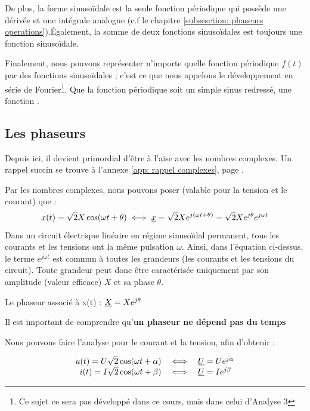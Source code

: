 \documentclass[12pt,a4paper]{article}
\newcommand{\ux}{\uline{X} }
\newcommand{\uu}{\uline{U} }
\begin{document}
De plus, la forme sinusoïdale est la seule fonction périodique qui possède une dérivée et une intégrale analogue (c.f le chapitre \ref{subsesction: phaseurs operations}).Également, la somme de deux fonctions sinusoïdales est toujours une fonction sinusoïdale.

 Finalement, nous pouvons représenter n'importe quelle fonction périodique $f(t)$ par des fonctions sinusoïdales ; c'est ce que nous appelons le développement en série de Fourier\footnote{Ce sujet ce sera pas développé dans ce cours, mais dans celui d'Analyse 3}. Que la fonction périodique soit un simple sinus redressé, une fonction .

\subsection{Les phaseurs}
 Depuis ici, il devient primordial d'être à l'aise avec les nombres complexes. Un rappel succin se trouve à l'annexe \ref{app: rappel complexes}, page \pageref{app: rappel complexes}. 

 Par les nombres complexes, nous pouvons poser (valable pour la tension et le courant) que :
\begin{equation}
	x(t) = \sqrt{2}X \cos(\omega t + \theta) \iff \uline{x} = \sqrt{2}Xe^{j(\omega t + \theta)} = \sqrt{2}Xe^{j\theta}e^{j\omega t}
\end{equation}
Dans un circuit électrique linéaire en régime sinusoïdal permanent, tous les courants et les tensions ont la même pulsation $\omega$. Ainsi, dans l'équation ci-dessus, le terme $e^{j\omega t}$ est commun à toutes les grandeurs (les courants et les tensions du circuit). Toute grandeur peut donc être caractérisée uniquement par son amplitude (valeur efficace) $X$ et sa phase $\theta$. 
\begin{boite}[0.48]
\centering
	Le phaseur associé à x(t) : $\ux = Xe^{j\theta}$
\end{boite}
Il est important de comprendre qu'\textbf{un phaseur ne dépend pas du temps}

Nous pouvons faire l'analyse pour le courant et la tension, afin d'obtenir :
\begin{boite}
\begin{equation}
	\begin{array}{rcl}
	u(t) = U\sqrt{2}\cos(\omega t + \alpha) & \iff & \uu = Ue^{j\alpha}\\
	i(t) = I\sqrt{2}\cos(\omega t + \beta) & \iff & \uu = Ie^{j\beta}
	\end{array}
	\label{equ: relation courant tension phaseur}
\end{equation}
\end{boite}
\end{document}
